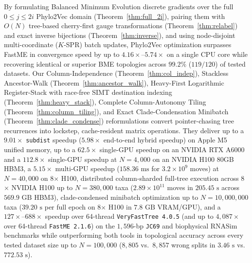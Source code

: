 \documentclass[11pt,a4paper]{article}
\makeatletter
\DeclareRobustCommand{\_}{\ifmmode\nfss@text{\textunderscore}\else\textunderscore\allowbreak\fi}
\theoremstyle{definition}
\makeatother
\begin{document}
By formulating Balanced Minimum Evolution discrete gradients over the full $0 \le j \le 2i$ Phylo2Vec domain (Theorem~\ref{thm:full_2i}), pairing them with $O(N)$ tree-based cherry-first gauge transformations (Theorem~\ref{thm:relabel}) and exact inverse bijections (Theorem~\ref{thm:inverse}), and using node-disjoint multi-coordinate ($K$-SPR) batch updates, Phylo2Vec optimization surpasses FastME in convergence speed by up to $4.16\times\text{--}5.74\times$ on a single CPU core while recovering identical or superior BME topologies across $99.2\%$ ($119/120$) of tested datasets. Our Column-Independence (Theorem~\ref{thm:col_indep}), Stackless Ancestor-Walk (Theorem~\ref{thm:ancestor_walk}), Heavy-First Logarithmic Register-Stack with race-free SIMT destination indexing (Theorem~\ref{thm:heavy_stack}), Complete Column-Autonomy Tiling (Theorem~\ref{thm:column_tiling}), and Exact Clade-Condensation Minibatch (Theorem~\ref{thm:clade_condense}) reformulations convert pointer-chasing tree recurrences into lockstep, cache-resident matrix operations. They deliver up to a $9.01\times$ \texttt{subdist} speedup ($5.98\times$ end-to-end hybrid speedup) on Apple M5 unified memory, up to a $62.5\times$ single-GPU speedup on an NVIDIA RTX A6000 and a $112.8\times$ single-GPU speedup at $N = 4{,}000$ on an NVIDIA H100 80GB HBM3, a $5.15\times$ multi-GPU speedup ($158.36\text{ ms}$ for $3.2 \times 10^9$ moves) at $N = 40{,}000$ on 8$\times$ H100, distributed column-sharded full-tree execution across 8$\times$ NVIDIA H100 up to $N = 380{,}000$ taxa ($2.89 \times 10^{11}$ moves in $205.45\text{ s}$ across $569.9\text{ GB}$ HBM3), clade-condensed minibatch optimization up to $N = 10{,}000{,}000$ taxa ($39.20\text{ s}$ per full epoch on 8$\times$ H100 in $7.8\text{ GB}$ VRAM/GPU), and a $127\times\text{--}688\times$ speedup over 64-thread \texttt{VeryFastTree 4.0.5} (and up to $4{,}087\times$ over 64-thread \texttt{FastME 2.1.6}) on the $1{,}596$-bp \texttt{JC69} and biophysical RNASim benchmarks while outperforming both tools in topological accuracy across every tested dataset size up to $N = 100{,}000$ ($8{,}805$ vs.\ $8{,}857$ wrong splits in $3.46\text{ s}$ vs.\ $772.53\text{ s}$).
\end{document}

